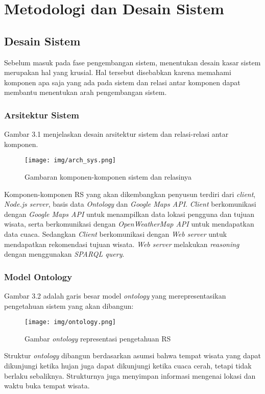 \chapter{Metodologi dan Desain Sistem}

\section{Desain Sistem}
Sebelum masuk pada fase pengembangan sistem, menentukan desain kasar sistem merupakan hal yang krusial. Hal tersebut disebabkan karena memahami komponen apa saja yang ada pada sistem dan relasi antar komponen dapat membantu menentukan arah pengembangan sistem. 
 
\subsection{Arsitektur Sistem}
\par
Gambar 3.1 menjelaskan desain arsitektur sistem dan relasi-relasi antar komponen.
\newline
\begin{figure}[h!]
    \centering
    \texttt{[image: img/arch\_sys.png]}
    \caption{Gambaran komponen-komponen sistem dan relasinya}
    \label{fig:Gambar}
\end{figure}
\par
Komponen-komponen RS yang akan dikembangkan penyusun terdiri dari \textit{client}, \textit{Node.js server}, basis data \textit{Ontology} dan \textit{Google Maps API}. \textit{Client} berkomunikasi dengan \textit{Google Maps API} untuk menampilkan data lokasi pengguna dan tujuan wisata, serta berkomunikasi dengan \textit{OpenWeatherMap API} untuk mendapatkan data cuaca. Sedangkan \textit{Client} berkomunikasi dengan \textit{Web server} untuk mendapatkan rekomendasi tujuan wisata. \textit{Web server} melakukan \textit{reasoning} dengan menggunakan \textit{SPARQL query}.

\subsection{Model Ontology}

Gambar 3.2 adalah garis besar model \textit{ontology} yang merepresentasikan pengetahuan sistem yang akan dibangun:
\begin{figure}[h!]
    \centering
    \texttt{[image: img/ontology.png]}
    \caption{Gambar \textit{ontology} representasi pengetahuan RS}
    \label{fig:Gambar}
\end{figure}
\newline
Struktur \textit{ontology} dibangun berdasarkan asumsi bahwa tempat wisata yang dapat dikunjungi ketika hujan juga dapat dikunjungi ketika cuaca cerah, tetapi tidak berlaku sebaliknya. Strukturnya juga menyimpan informasi mengenai lokasi dan waktu buka tempat wisata.
 
